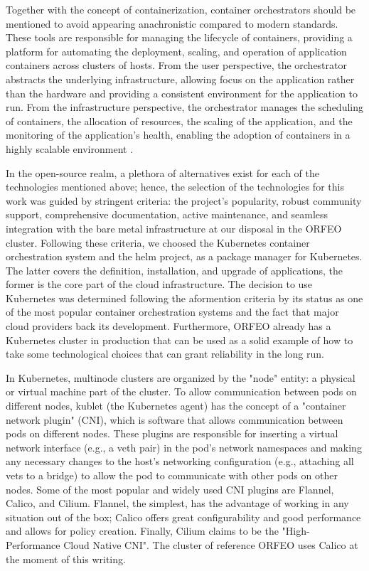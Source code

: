 Together with the concept of containerization, container orchestrators should be
mentioned to avoid appearing anachronistic compared to modern standards.
These tools are responsible for managing the lifecycle of containers, providing
a platform for automating the deployment, scaling, and operation of application
containers across clusters of hosts.
From the user perspective, the orchestrator abstracts the underlying
infrastructure, allowing focus on the application rather than the hardware and
providing a consistent environment for the application to run. From the
infrastructure perspective, the orchestrator manages the scheduling of
containers, the allocation of resources, the scaling of the application, and the
monitoring of the application's health, enabling the adoption of containers in a
highly scalable environment \cite{bookofkubernetes}.

In the open-source realm, a plethora of alternatives exist for each of the
technologies mentioned above; hence, the selection of the technologies for this
work was guided by stringent criteria:
the project's popularity, robust community support, comprehensive documentation,
active maintenance, and seamless integration with the bare metal infrastructure
at our disposal in the ORFEO cluster.
Following these criteria, we choosed the Kubernetes container orchestration
system and the helm project, as a package manager for Kubernetes. The latter
covers the definition, installation, and upgrade of applications, the former is
the core part of the  cloud infrastructure.
The decision to use Kubernetes was determined following the aformention criteria
by its status as one of the most popular container orchestration systems and the
fact that major cloud providers back its development.
Furthermore, ORFEO already has a Kubernetes cluster in production that can be
used as a solid example of how to take some technological choices that can grant
reliability in the long run.

In Kubernetes, multinode clusters are organized by the "node" entity: a physical
or virtual machine part of the cluster. To allow communication between pods on
different nodes, kublet (the Kubernetes agent) has the concept of a "container
network plugin" (CNI), which is software that allows communication between pods
on different nodes. These plugins are responsible for inserting a virtual
network interface (e.g., a veth pair) in the pod's network namespaces and making
any necessary changes to the host's networking configuration (e.g., attaching
all vets to a bridge) to allow the pod to communicate with other pods on other
nodes.
Some of the most popular and widely used CNI plugins are Flannel, Calico, and
Cilium. Flannel, the simplest, has the advantage of working in any situation out
of the box; Calico offers great configurability and good performance and allows
for policy creation. Finally, Cilium claims to be the "High-Performance Cloud
Native CNI". The cluster of reference ORFEO uses Calico at the moment of this
writing.

